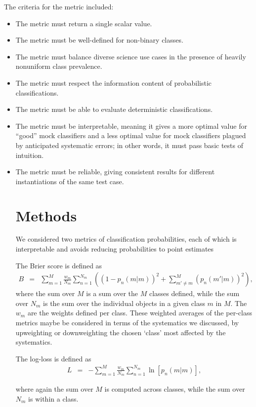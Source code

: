 \documentclass[\docopts]{\docclass}
\begin{document}
The criteria for the metric included:
\begin{itemize}
\item The metric must return a single scalar value.
\item The metric must be well-defined for non-binary classes.
\item The metric must balance diverse science use cases in the presence of heavily nonuniform class prevalence.
\item The metric must respect the information content of probabilistic classifications.
\item The metric must be able to evaluate deterministic classifications.
\item The metric must be interpretable, meaning it gives a more optimal value for ``good'' mock classifiers and a less optimal value for mock classifiers plagued by anticipated systematic errors; in other words, it must pass basic tests of intuition.
\item The metric must be reliable, giving consistent results for different instantiations of the same test case.

\section{Methods}
\label{sec:methods}
We considered two metrics of classification probabilities, each of which is interpretable and avoids reducing probabilities to point estimates

The Brier score is defined as
\begin{eqnarray*}
B &=& \sum_{m=1}^{M}\frac{w_{m}}{N_{m}}\sum_{n=1}^{N_{m}}\left((1-p_{n}(m | m))^{2}+\sum_{m'\neq m}^{M}(p_{n}(m' | m))^{2}\right),
\end{eqnarray*}
where the sum over $M$ is a sum over the $M$ classes defined, while the sum over $N_m$ is the sum over the individual objects in a given class $m$ in $M$. The $w_m$ are the weights defined per class.
These weighted averages of the per-class metrics maybe be considered in terms of the systematics we discussed, by upweighting or downweighting the chosen `class' most affected by the systematics.

The log-loss is defined as
\begin{eqnarray*}
L &=& -\sum_{m=1}^{M}\frac{w_{m}}{N_{m}}\sum_{n=1}^{N_{m}}\ln[p_{n}(m | m)],
\end{eqnarray*}

where again the sum over $M$ is computed across classes, while the sum over $N_m$ is within a class.


\end{itemize}
\end{document}
